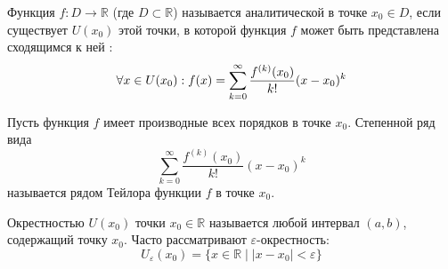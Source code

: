 \documentclass{article}
\begin{document}

\begin{definition}
Функция $f: D \to \mathbb{R}$ (где $D \subset \mathbb{R}$) называется аналитической в точке $x_0 \in D$, если существует  $U(x_0)$ этой точки, в которой функция $f$ может быть представлена сходящимся к ней :
\[
\forall x \in U(x_0): f(x) = \sum_{k=0}^{\infty} \frac{f^{(k)}(x_0)}{k!} (x - x_0)^k
\]
\end{definition}



\begin{definition}
Пусть функция $f$ имеет производные всех порядков в точке $x_0$. Степенной ряд вида
\[
\sum_{k=0}^{\infty} \frac{f^{(k)}(x_0)}{k!} (x - x_0)^k
\]
называется рядом Тейлора функции $f$ в точке $x_0$.
\end{definition}



\begin{definition}
Окрестностью $U(x_0)$ точки $x_0 \in \mathbb{R}$ называется любой интервал $(a, b)$, содержащий точку $x_0$. 
Часто рассматривают $\varepsilon$-окрестность:
\[
U_\varepsilon(x_0) = \{x \in \mathbb{R} \mid |x - x_0| < \varepsilon\}
\]
\end{definition}
\end{document}
